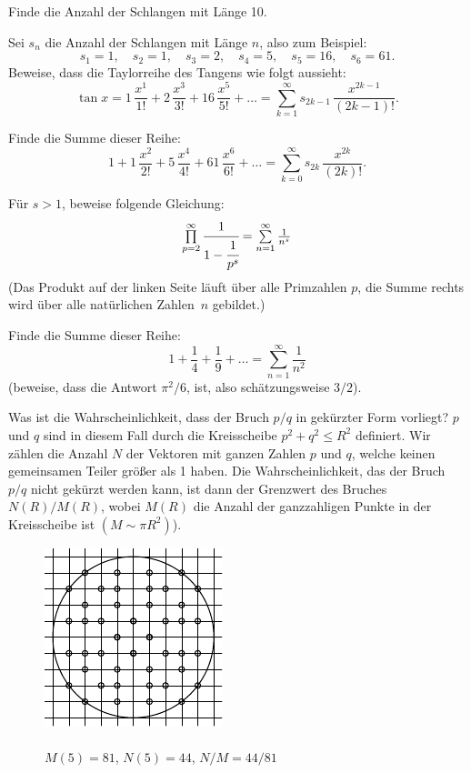 \documentclass[12pt]{article} %
\begin{document}
\medskip
\noindent 
Finde die Anzahl der Schlangen mit Länge 10. 

\bigskip
{} Sei $s_n$ die Anzahl der Schlangen mit Länge $n$, also zum Beispiel: 
$$
s_1=1, \quad s_2=1, \quad s_3=2, \quad s_4=5, \quad s_5=16, \quad s_6=61.
$$
Beweise, dass die Taylorreihe des Tangens wie folgt aussieht: 
$$
\tan x=1\, \frac{x^1}{1!}+2\, \frac{x^3}{3!}+16\, \frac{x^5}{5!}+\dots=
\textstyle\sum\limits_{k=1}^{\infty} s_{2k-1}\, \frac{x^{2k-1}}{(2k-1)!}.
$$

\bigskip
{} Finde die Summe dieser Reihe:
$$
1+1\, \frac{x^2}{2!}+5\, \frac{x^4}{4!}+61\, \frac{x^6}{6!}+\dots=
\textstyle\sum\limits_{k=0}^{\infty} s_{2k}\,\frac{x^{2k}}{(2k)!}.
$$

\bigskip
{} Für $s>1$, beweise folgende Gleichung:
$$
\textstyle\prod\limits_{p=2}^{\infty} \cfrac{1}{1-\cfrac{1}{p^s}}=\sum\limits_{n=1}^{\infty} \frac{1}{n^s}
$$ 
(Das Produkt auf der linken Seite läuft über alle Primzahlen $p$, die Summe rechts wird über alle natürlichen Zahlen~$n$ gebildet.) 

\newpage
{} Finde die Summe dieser Reihe:
$$
1+ \frac{1}{4}+ \frac{1}{9}+\dots=\textstyle\sum\limits_{n=1}^{\infty} \frac{1}{n^2}
$$
(beweise, dass die Antwort $\pi^2/6$, ist, also schätzungsweise $3/2$). 

\bigskip
{} Was ist die Wahrscheinlichkeit, dass der Bruch $p/q$ in gekürzter Form vorliegt? $p$ und $q$ sind in diesem Fall durch die Kreisscheibe $p^2+q^2 \leqslant R^2$ definiert. Wir zählen die Anzahl $N$ der Vektoren mit ganzen Zahlen $p$ und $q$, welche keinen gemeinsamen Teiler größer als 1 haben. Die Wahrscheinlichkeit, das der Bruch $p/q$ nicht gekürzt werden kann, ist dann der Grenzwert des Bruches $N(R)/M(R)$, wobei $M(R)$ die Anzahl der ganzzahligen Punkte in der Kreis\-schei\-be ist $(M \sim \pi R^2)$).
\begin{figure}[h]
\footnotesize
\centering
\includegraphics{taskbook-36}\\{\ } \\
$M(5)=81$, $N(5)=44$, $N/M = 44/81$
\end{figure}
\end{document}
